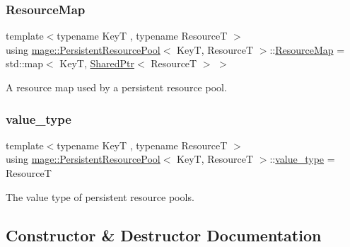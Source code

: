 \subsubsection{\texorpdfstring{Resource\+Map}{ResourceMap}}
{\footnotesize\ttfamily template$<$typename KeyT , typename ResourceT $>$ \\
using \mbox{\hyperlink{classmage_1_1_persistent_resource_pool}{mage\+::\+Persistent\+Resource\+Pool}}$<$ KeyT, ResourceT $>$\+::\mbox{\hyperlink{classmage_1_1_persistent_resource_pool_a9215c5816fc45ab5f772625df2a8a60c}{Resource\+Map}} =  std\+::map$<$ KeyT, \mbox{\hyperlink{namespacemage_a1e01ae66713838a7a67d30e44c67703e}{Shared\+Ptr}}$<$ ResourceT $>$ $>$\hspace{0.3cm}{\ttfamily [private]}}

A resource map used by a persistent resource pool. \mbox{\label{classmage_1_1_persistent_resource_pool_a2311ac7d92bb3c23950c2d88e9213d16}} 
\subsubsection{\texorpdfstring{value\+\_\+type}{value\_type}}
{\footnotesize\ttfamily template$<$typename KeyT , typename ResourceT $>$ \\
using \mbox{\hyperlink{classmage_1_1_persistent_resource_pool}{mage\+::\+Persistent\+Resource\+Pool}}$<$ KeyT, ResourceT $>$\+::\mbox{\hyperlink{classmage_1_1_persistent_resource_pool_a2311ac7d92bb3c23950c2d88e9213d16}{value\+\_\+type}} =  ResourceT}

The value type of persistent resource pools. 

\subsection{Constructor \& Destructor Documentation}
\mbox{\label{classmage_1_1_persistent_resource_pool_a23b83adf594628b93c368a2da7660ef8}} 

